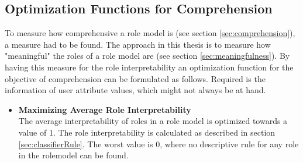         \subsection{Optimization Functions for Comprehension}
        \label{sec:optimizationComprehension}
        To measure how comprehensive a role model is (see section \ref{sec:comprehension}), a measure had to be found. The approach in this thesis is to measure how "meaningful" the roles of a role model are (see section \ref{sec:meaningfulness}). By having this measure for the role interpretability an optimization function for the objective of comprehension can be formulated as follows. Required is the information of user attribute values, which might not always be at hand.
        \begin{itemize}
            \item \textbf{Maximizing Average Role Interpretability}\\
            The average interpretability of roles in a role model is optimized towards a value of 1. The role interpretability is calculated as described in section \ref{sec:classifierRule}. The worst value is 0, where no descriptive rule for any role in the rolemodel can be found.
        \end{itemize}
